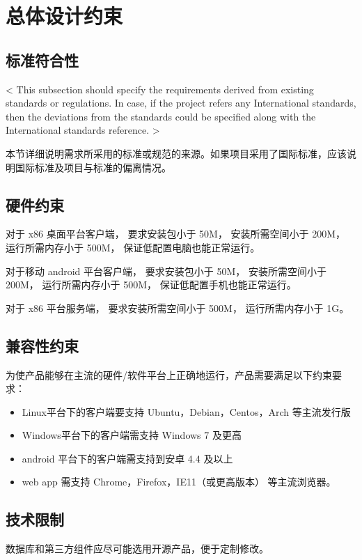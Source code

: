 \chapter{总体设计约束}

 
\section{标准符合性}
< This subsection should specify the requirements derived from existing standards or regulations. In case, if the project refers any International standards, then the deviations from the standards could be specified along with the International standards reference. >

本节详细说明需求所采用的标准或规范的来源。如果项目采用了国际标准，应该说明国际标准及项目与标准的偏离情况。

\section{硬件约束}


对于 x86 桌面平台客户端，
要求安装包小于 50M，
安装所需空间小于 200M，
运行所需内存小于 500M，
保证低配置电脑也能正常运行。

对于移动 android 平台客户端，
要求安装包小于 50M，
安装所需空间小于 200M，
运行所需内存小于 500M，
保证低配置手机也能正常运行。

对于 x86 平台服务端，
要求安装所需空间小于 500M，
运行所需内存小于 1G。

\section{兼容性约束}
为使产品能够在主流的硬件/软件平台上正确地运行，产品需要满足以下约束要求：
\begin{itemize}
    \item Linux平台下的客户端要支持 Ubuntu，Debian，Centos，Arch 等主流发行版
    \item Windows平台下的客户端需支持 Windows 7 及更高
    \item android 平台下的客户端需支持到安卓 4.4 及以上
    \item web app 需支持 Chrome，Firefox，IE11（或更高版本） 等主流浏览器。
    \end{itemize}

\section{技术限制}


数据库和第三方组件应尽可能选用开源产品，便于定制修改。
